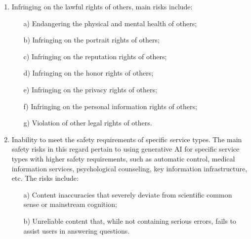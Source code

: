 \documentclass{article}
\begin{document}
\begin{enumerate}
    \item Infringing on the lawful rights of others, main risks include:
    \begin{itemize}
        \item[a)] Endangering the physical and mental health of others;
        \item[b)] Infringing on the portrait rights of others;
        \item[c)] Infringing on the reputation rights of others;
        \item[d)] Infringing on the honor rights of others;
        \item[e)] Infringing on the privacy rights of others;
        \item[f)] Infringing on the personal information rights of others;
        \item[g)] Violation of other legal rights of others.
    \end{itemize}

    \item Inability to meet the safety requirements of specific service types. The main safety risks in this regard pertain to using generative AI for specific service types with higher safety requirements, such as automatic control, medical information services, psychological counseling, key information infrastructure, etc. The risks include:
    \begin{itemize}
        \item[a)] Content inaccuracies that severely deviate from scientific common sense or mainstream cognition;
        \item[b)] Unreliable content that, while not containing serious errors, fails to assist users in answering questions.
    \end{itemize}
\end{enumerate}
\end{document}
